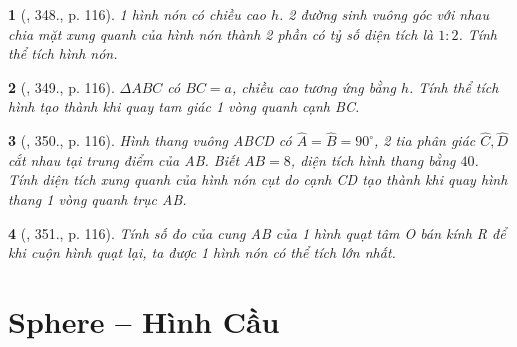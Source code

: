 \documentclass{article}
\newtheorem{baitoan}{}
\begin{document}
\begin{baitoan}[\cite{Binh_Toan_9_tap_2}, 348., p. 116]
	1 hình nón có chiều cao $h$. 2 đường sinh vuông góc với nhau chia mặt xung quanh của hình nón thành 2 phần có tỷ số diện tích là $1:2$. Tính thể tích hình nón.
\end{baitoan}

\begin{baitoan}[\cite{Binh_Toan_9_tap_2}, 349., p. 116]
	$\Delta ABC$ có $BC = a$, chiều cao tương ứng bằng $h$. Tính thể tích hình tạo thành khi quay tam giác 1 vòng quanh cạnh BC.
\end{baitoan}

\begin{baitoan}[\cite{Binh_Toan_9_tap_2}, 350., p. 116]
	Hình thang vuông ABCD có $\widehat{A} = \widehat{B} = 90^\circ$, 2 tia phân giác $\widehat{C},\widehat{D}$ cắt nhau tại trung điểm của AB. Biết $AB = 8$, diện tích hình thang bằng $40$. Tính diện tích xung quanh của hình nón cụt do cạnh CD tạo thành khi quay hình thang 1 vòng quanh trục AB.
\end{baitoan}

\begin{baitoan}[\cite{Binh_Toan_9_tap_2}, 351., p. 116]
	Tính số đo của cung AB của 1 hình quạt tâm O bán kính R để khi cuộn hình quạt lại, ta được 1 hình nón có thể tích lớn nhất.
\end{baitoan}


\section{Sphere -- Hình Cầu}
\end{document}
